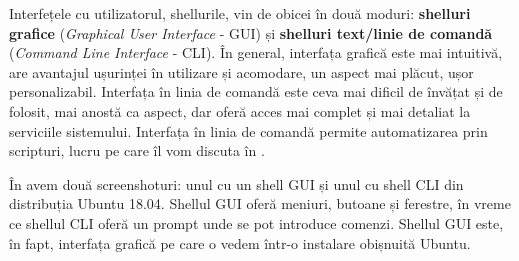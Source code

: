 Interfețele cu utilizatorul, shellurile, vin de obicei în două moduri: \textbf{shelluri grafice} (\textit{Graphical User Interface} - GUI) și \textbf{shelluri text/linie de comandă} (\textit{Command Line Interface} - CLI). În general, interfața grafică este mai intuitivă, are avantajul ușurinței în utilizare și acomodare, un aspect mai plăcut, ușor personalizabil. Interfața în linia de comandă este ceva mai dificil de învățat și de folosit, mai anostă ca aspect, dar oferă acces mai complet și mai detaliat la serviciile sistemului. Interfața în linia de comandă permite automatizarea prin scripturi, lucru pe care îl vom discuta în .

În  avem două screenshoturi: unul cu un shell GUI și unul cu shell CLI din distribuția Ubuntu 18.04. Shellul GUI oferă meniuri, butoane și ferestre, în vreme ce shellul CLI oferă un prompt unde se pot introduce comenzi. Shellul GUI este, în fapt, interfața grafică pe care o vedem într-o instalare obișnuită Ubuntu.

